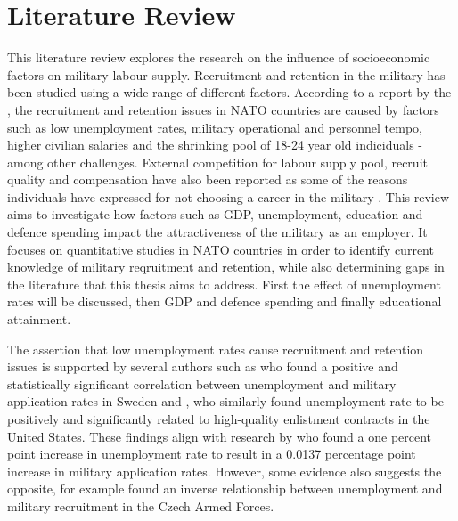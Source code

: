 \chapter{Literature Review}

This literature review explores the research on the influence of socioeconomic 
factors on military labour supply. 
Recruitment and retention in the military has been studied using a wide range of
different factors. According to a report by the \textcite{nato_research_and_technology_organization_recruiting_2007}, 
the recruitment and retention issues in NATO countries are 
caused by factors such as low unemployment rates, military operational and personnel tempo,
higher civilian salaries and the shrinking pool of 18-24 year old indiciduals - among 
other challenges. External
competition for labour supply pool, recruit quality and compensation have also been 
reported as some of the reasons
individuals have expressed for not choosing a career in the military \parencite{nato_research_and_technology_organization_recruiting_2007}.
This review aims to investigate how 
factors such as GDP, unemployment, education and defence spending impact the 
attractiveness of the military as an employer. It focuses 
on quantitative studies in NATO countries in order to identify 
current knowledge of military reqruitment and retention, while also determining 
gaps in the literature that this thesis aims to address. 
First the effect of unemployment rates will be discussed, then GDP and defence spending 
and finally educational attainment.

The assertion that low unemployment rates 
cause recruitment and retention issues is supported by several authors such as 
\textcite{backstrom_are_2019} who found a positive and statistically significant correlation 
between unemployment and military application rates in Sweden and \textcite{asch_cash_2010},
who similarly found unemployment rate to be positively and significantly related to
high-quality enlistment contracts in the United States. These findings align with 
research by \textcite{balcaen_unemployment_2025} who found a one percent point increase in 
unemployment rate to result in a 0.0137 percentage point increase in military 
application rates. However, some evidence also suggests the opposite, for example 
\textcite{holcner_military_2021} found an inverse relationship between unemployment and military 
recruitment in the Czech Armed Forces.

